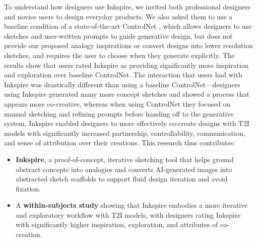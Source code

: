\documentclass[sigconf, screen]{acmart}
\begin{document}
To understand how designers use Inkspire, we invited both professional designers and novice users to design everyday products. We also asked them to use a baseline condition of a state-of-the-art ControlNet \cite{zhang2023adding}, which allows designers to use sketches and user-written prompts to guide generative design, but does not provide our proposed analogy inspirations or convert designs into lower resolution sketches, and requires the user to choose when they generate explicitly. 
The results show that users rated Inkspire as providing significantly more inspiration and exploration over baseline ControlNet. 
The interaction that users had with Inkspire was drastically different than using a baseline ControlNet---designers using Inkspire generated many more concept sketches and showed a process that appears more co-creative, whereas when using ControlNet they focused on manual sketching and refining prompts before handing off to the generative system.
Inkspire enabled designers to more effectively co-create designs with T2I models with significantly increased partnership, controllability, communication, and sense of attribution over their creations.
This research thus contributes:
\begin{itemize}
\item{\textbf{Inkspire}, a proof-of-concept, iterative sketching tool that helps ground abstract concepts into analogies and converts AI-generated images into abstracted sketch scaffolds to support fluid design iteration and avoid fixation.}
\item{A \textbf{within-subjects study} showing that Inkspire embodies a more iterative and exploratory workflow with T2I models, with designers rating Inkspire with significantly higher inspiration, exploration, and attributes of co-creation.}
\end{itemize}
\end{document}

